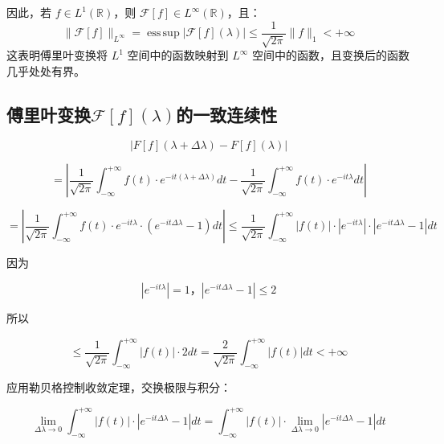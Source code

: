 \documentclass[12pt,a4paper]{article}
\theoremstyle{plain}
\theoremstyle{definition}
\theoremstyle{remark}
\begin{document}
	因此，若 $f \in L^1(\mathbb{R})$，则 $\mathcal{F}[f] \in L^\infty(\mathbb{R})$，且：
	\[
	\|\mathcal{F}[f]\|_{L^\infty} = \operatorname{ess\,sup} |\mathcal{F}[f](\lambda)| \leq \frac{1}{\sqrt{2\pi}} \|f\|_1 < +\infty
	\]
	这表明傅里叶变换将 $L^1$ 空间中的函数映射到 $L^\infty$ 空间中的函数，且变换后的函数几乎处处有界。
	
\subsection{傅里叶变换\(\mathcal{F}[f](\lambda)\)的一致连续性}


\[ |F[f](\lambda + \Delta \lambda) - F[f](\lambda)| \]

\[ = \left| \frac{1}{\sqrt{2\pi}} \int_{-\infty}^{+\infty} f(t) \cdot e^{-it(\lambda + \Delta \lambda)} dt - \frac{1}{\sqrt{2\pi}} \int_{-\infty}^{+\infty} f(t) \cdot e^{-it\lambda} dt \right| \]

\[ = \left| \frac{1}{\sqrt{2\pi}} \int_{-\infty}^{+\infty} f(t) \cdot e^{-it\lambda} \cdot (e^{-it\Delta \lambda} - 1) dt \right| \leq \frac{1}{\sqrt{2\pi}} \int_{-\infty}^{+\infty} |f(t)| \cdot |e^{-it\lambda}| \cdot |e^{-it\Delta \lambda} - 1| dt \]

因为

\[ |e^{-it\lambda}| = 1，	|e^{-it\Delta \lambda} - 1| \leq 2 \]

所以

\[ \leq \frac{1}{\sqrt{2\pi}} \int_{-\infty}^{+\infty} |f(t)| \cdot 2 dt = \frac{2}{\sqrt{2\pi}} \int_{-\infty}^{+\infty} |f(t)| dt < +\infty \]

应用勒贝格控制收敛定理，交换极限与积分：

\[ \lim_{\Delta \lambda \to 0} \int_{-\infty}^{+\infty} |f(t)| \cdot |e^{-it\Delta \lambda} - 1| dt = \int_{-\infty}^{+\infty} |f(t)| \cdot \lim_{\Delta \lambda \to 0} |e^{-it\Delta \lambda} - 1| dt \]
\end{document}
